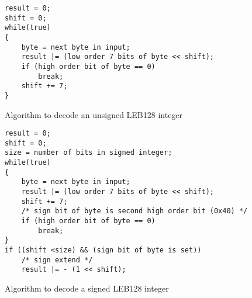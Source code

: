\begin{figure}[ht]
\begin{lstlisting}
result = 0;
shift = 0;
while(true)
{
    byte = next byte in input;
    result |= (low order 7 bits of byte << shift);
    if (high order bit of byte == 0)
        break;
    shift += 7;
}
\end{lstlisting}
\caption{Algorithm to decode an unsigned LEB128 integer}
\end{figure}

\begin{figure}[ht]
\begin{lstlisting}
result = 0;
shift = 0;
size = number of bits in signed integer;
while(true)
{
    byte = next byte in input;
    result |= (low order 7 bits of byte << shift);
    shift += 7;
    /* sign bit of byte is second high order bit (0x40) */
    if (high order bit of byte == 0)
        break;
}
if ((shift <size) && (sign bit of byte is set))
    /* sign extend */
    result |= - (1 << shift);
\end{lstlisting}
\caption{Algorithm to decode a signed LEB128 integer}
\end{figure}
